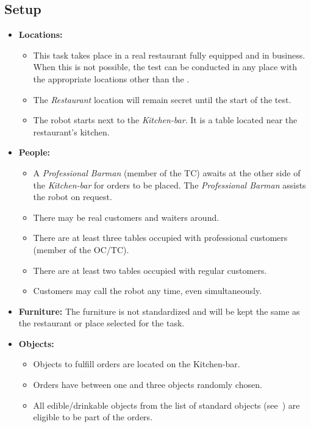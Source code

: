 \subsection*{Setup}
\begin{itemize}[nosep]	
	\item \textbf{Locations:} 
	\begin{itemize}
		\item This task takes place in a real restaurant fully equipped and in business. When this is not possible, the test can be conducted in any place with the appropriate locations other than the \Arena{}.
		\item The \emph{Restaurant} location will remain secret until the start of the test.
		\item The robot starts next to the \emph{Kitchen-bar}. It is a table located near the restaurant's kitchen.
	\end{itemize}	 
	\item \textbf{People:} 
	\begin{itemize}
		\item  A \emph{Professional Barman} (member of the TC) awaits at the other side of the \emph{Kitchen-bar} for orders to be placed. The \emph{Professional Barman} assists the robot on request.
		\item There may be real customers and waiters around.
		\item There are at least three tables occupied with professional customers (member of the OC/TC). 
		\item There are at least two tables occupied with regular customers.
		\item Customers may call the robot any time, even simultaneously.
	\end{itemize}
	\item \textbf{Furniture:} The furniture is not standardized and will be kept the same as the restaurant or place selected for the task.
	\item \textbf{Objects:} 
	\begin{itemize}
	\item Objects to fulfill orders are located on the Kitchen-bar.
	\item Orders have between one and three objects randomly chosen.
	\item All edible/drinkable objects from the list of standard objects (see~) are eligible to be part of the orders.
	\end{itemize}
\end{itemize}

